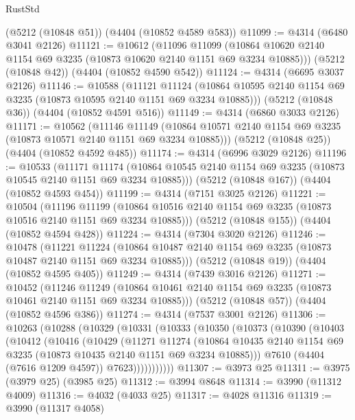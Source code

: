 \begin{lexlean}{RustStd}
\begin{coremodule}
{\begin{coremodule}
{{{{{{{{{{{{{{{{    (@5212 (@10848 @51))
    (@4404 (@10852 @4589 @583))
@11099 := @4314 (@6480 @3041 @2126)
@11121 := @10612
    (@11096
      @11099
      (@10864 @10620 @2140 @1154 @69 @3235 (@10873 @10620 @2140 @1151 @69 @3234 @10885)))
    (@5212 (@10848 @42))
    (@4404 (@10852 @4590 @542))
@11124 := @4314 (@6695 @3037 @2126)
@11146 := @10588
    (@11121
      @11124
      (@10864 @10595 @2140 @1154 @69 @3235 (@10873 @10595 @2140 @1151 @69 @3234 @10885)))
    (@5212 (@10848 @36))
    (@4404 (@10852 @4591 @516))
@11149 := @4314 (@6860 @3033 @2126)
@11171 := @10562
    (@11146
      @11149
      (@10864 @10571 @2140 @1154 @69 @3235 (@10873 @10571 @2140 @1151 @69 @3234 @10885)))
    (@5212 (@10848 @25))
    (@4404 (@10852 @4592 @485))
@11174 := @4314 (@6996 @3029 @2126)
@11196 := @10533
    (@11171
      @11174
      (@10864 @10545 @2140 @1154 @69 @3235 (@10873 @10545 @2140 @1151 @69 @3234 @10885)))
    (@5212 (@10848 @167))
    (@4404 (@10852 @4593 @454))
@11199 := @4314 (@7151 @3025 @2126)
@11221 := @10504
    (@11196
      @11199
      (@10864 @10516 @2140 @1154 @69 @3235 (@10873 @10516 @2140 @1151 @69 @3234 @10885)))
    (@5212 (@10848 @155))
    (@4404 (@10852 @4594 @428))
@11224 := @4314 (@7304 @3020 @2126)
@11246 := @10478
    (@11221
      @11224
      (@10864 @10487 @2140 @1154 @69 @3235 (@10873 @10487 @2140 @1151 @69 @3234 @10885)))
    (@5212 (@10848 @19))
    (@4404 (@10852 @4595 @405))
@11249 := @4314 (@7439 @3016 @2126)
@11271 := @10452
    (@11246
      @11249
      (@10864 @10461 @2140 @1154 @69 @3235 (@10873 @10461 @2140 @1151 @69 @3234 @10885)))
    (@5212 (@10848 @57))
    (@4404 (@10852 @4596 @386))
@11274 := @4314 (@7537 @3001 @2126)
@11306 := @10263
    (@10288
      (@10329
        (@10331
          (@10333
            (@10350
              (@10373
                (@10390
                  (@10403
                    (@10412
                      (@10416
                        (@10429
                          (@11271
                            @11274
                            (@10864
                              @10435
                              @2140
                              @1154
                              @69
                              @3235
                              (@10873 @10435 @2140 @1151 @69 @3234 @10885)))
                          @7610
                          (@4404 (@7616 @1209 @4597))
                          @7623)))))))))))
@11307 := @3973 @25
@11311 := @3975 (@3979 @25) (@3985 @25)
@11312 := @3994 @8648
@11314 := @3990 (@11312 @4009)
@11316 := @4032 (@4033 @25)
@11317 := @4028 @11316
@11319 := @3990 (@11317 @4058)
}}}}}}}}}}}}}}}}
\end{coremodule}}
\end{coremodule}
\end{lexlean}
